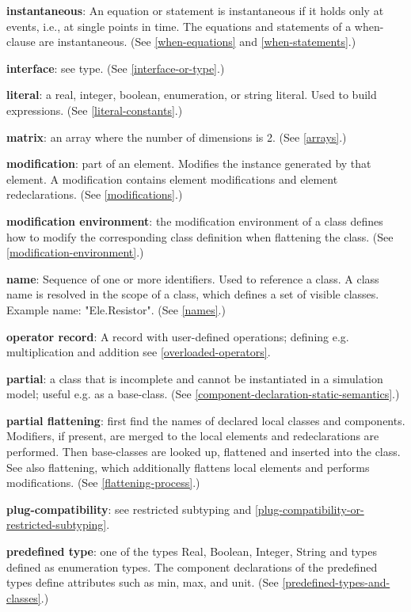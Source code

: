 \documentclass[../MLS.tex]{subfiles}
\begin{document}
\textbf{instantaneous}: An equation or statement is instantaneous if it
holds only at events, i.e., at single points in time. The equations and
statements of a when-clause are instantaneous. (See \autoref{when-equations} and
\autoref{when-statements}.)

\textbf{interface}: see type. (See \autoref{interface-or-type}.)

\textbf{literal}: a real, integer, boolean, enumeration, or string
literal. Used to build expressions. (See \autoref{literal-constants}.)

\textbf{matrix}: an array where the number of dimensions is 2. (See
\autoref{arrays}.)

\textbf{modification}: part of an element. Modifies the instance
generated by that element. A modification contains element modifications
and element redeclarations. (See \autoref{modifications}.)

\textbf{modification environment}: the modification environment of a
class defines how to modify the corresponding class definition when
flattening the class. (See \autoref{modification-environment}.)

\textbf{name}: Sequence of one or more identifiers. Used to reference a
class. A class name is resolved in the scope of a class, which defines a
set of visible classes. Example name: "Ele.Resistor". (See \autoref{names}.)

\textbf{operator record}: A record with user-defined operations;
defining e.g. multiplication and addition see \autoref{overloaded-operators}.

\textbf{partial}: a class that is incomplete and cannot be instantiated
in a simulation model; useful e.g. as a base-class. (See \autoref{component-declaration-static-semantics}.)

\textbf{partial flattening}: first find the names of declared local
classes and components. Modifiers, if present, are merged to the local
elements and redeclarations are performed. Then base-classes are looked
up, flattened and inserted into the class. See also flattening, which
additionally flattens local elements and performs modifications. (See
\autoref{flattening-process}.)

\textbf{plug-compatibility}: see restricted subtyping and \autoref{plug-compatibility-or-restricted-subtyping}.

\textbf{predefined type}: one of the types Real, Boolean, Integer,
String and types defined as enumeration types. The component
declarations of the predefined types define attributes such as min, max,
and unit. (See \autoref{predefined-types-and-classes}.)
\end{document}

